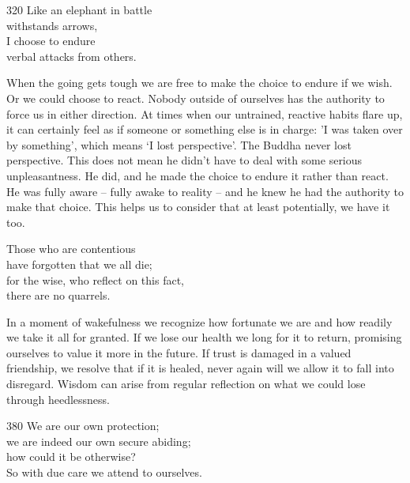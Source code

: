 
\begin{dhpVerse}{320}
\label{dhp-320}
Like an elephant in battle\\
withstands arrows,\\
I choose to endure\\
verbal attacks from others.
\end{dhpVerse}

\begin{dhpRefl}
When the going gets tough we are free to make the choice to endure if we wish. Or we could choose to react. Nobody outside of ourselves has the authority to force us in either direction. At times when our untrained, reactive habits flare up, it can certainly feel as if someone or something else is in charge: 'I was taken over by something', which means `I lost perspective'. The Buddha never lost perspective. This does not mean he didn't have to deal with some serious unpleasantness. He did, and he made the choice to endure it rather than react. He was fully aware – fully awake to reality – and he knew he had the authority to make that choice. This helps us to consider that at least potentially, we have it too.
\end{dhpRefl}


\begin{dhpVerse}{6}
\label{dhp-6}
Those who are contentious\\
have forgotten that we all die;\\
for the wise, who reflect on this fact,\\
there are no quarrels.
\end{dhpVerse}

\begin{dhpRefl}
In a moment of wakefulness we recognize how fortunate we are and how readily we take it all for granted. If we lose our health we long for it to return, promising ourselves to value it more in the future. If trust is damaged in a valued friendship, we resolve that if it is healed, never again will we allow it to fall into disregard. Wisdom can arise from regular reflection on what we could lose through heedlessness.
\end{dhpRefl}


\begin{dhpVerse}{380}
\label{dhp-380}
We are our own protection;\\
we are indeed our own secure abiding;\\
how could it be otherwise?\\
So with due care we attend to ourselves.
\end{dhpVerse}


